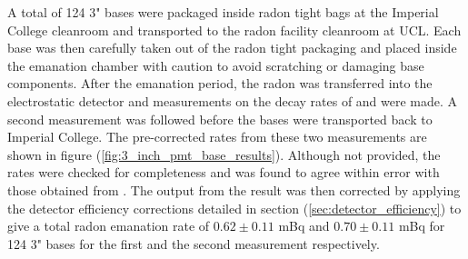 A total of 124 3" bases were packaged inside radon tight bags at the Imperial College cleanroom and transported to the radon facility cleanroom at UCL. Each base was then carefully taken out of the radon tight packaging and placed inside the emanation chamber with caution to avoid scratching or damaging base components. After the emanation period, the radon was transferred into the electrostatic detector and measurements on the decay rates of \PoTOF{} and \PoTOE{} were made. A second measurement was followed before the bases were transported back to Imperial College. The pre-corrected \PoTOF{} rates from these two measurements are shown in figure (\ref{fig:3_inch_pmt_base_results}). Although not provided, the \PoTOE{} rates were checked for completeness and was found to agree within error with those obtained from \PoTOF{}. The output from the \PoTOF{} result was then corrected by applying the detector efficiency corrections detailed in section (\ref{sec:detector_efficiency}) to give a total radon emanation rate of $0.62\pm0.11$ mBq and $0.70\pm0.11$ mBq for 124 3" bases for the first and the second measurement respectively. 
%
